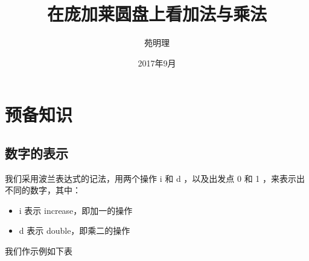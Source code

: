 \documentclass[a4paper,12pt]{article}
\title{在庞加莱圆盘上看加法与乘法}
\author{苑明理}
\date{2017年9月}
\begin{document}
\maketitle{}

\renewcommand\contentsname{目录}
\setcounter{tocdepth}{2}
\tableofcontents

\newpage

\section{预备知识}

\subsection{数字的表示}

我们采用波兰表达式的记法，用两个操作 i 和 d ，以及出发点 0 和 1 ，来表示出不同的数字，其中：

\begin{itemize}
\item i 表示 increase，即加一的操作
\item d 表示 double，即乘二的操作
\end{itemize}

我们作示例如下表
\end{document}
